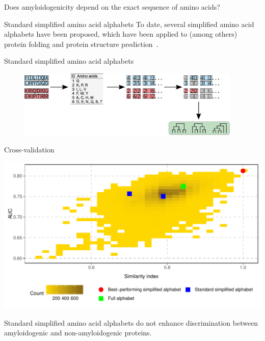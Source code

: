 \documentclass{beamer}\usepackage[]{graphicx}\usepackage[]{color}
\makeatletter
\def\maxwidth{ %
  \ifdim\Gin@nat@width>\linewidth
    \linewidth
  \else
    \Gin@nat@width
  \fi
}
\newenvironment{knitrout}{}{} %
\makeatother
\begin{document}
\begin{frame}
  Does amyloidogenicity depend on the exact sequence of amino acids?
  \end{frame}

\begin{frame}{Standard simplified amino acid alphabets}
To date, several simplified amino acid alphabets have been proposed, which have been applied to (among others) protein folding and protein structure prediction~\citep{kosiol_new_2004, melo_accuracy_2006}.
  \end{frame}
  
    \begin{frame}{Standard simplified amino acid alphabets}
\begin{figure} 
\includegraphics[width=0.95\textwidth]{static_figure/ngram2.eps}
\end{figure}


  \end{frame}


    \begin{frame}{Cross-validation}
\begin{knitrout}
\color{fgcolor}

{\centering \includegraphics[width=\maxwidth]{figure/unnamed-chunk-11-1} 

}



\end{knitrout}

Standard simplified amino acid alphabets do not enhance discrimination between amyloidogenic and non-amyloidogenic proteins.
  
  \end{frame}
\end{document}
